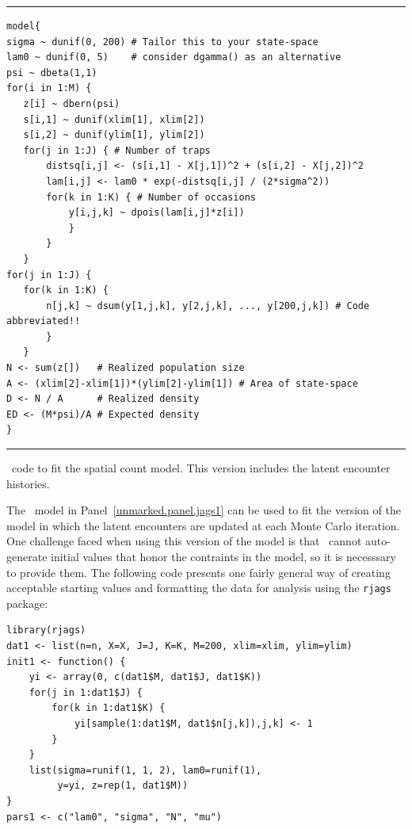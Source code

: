 \begin{panel}
\centering
\rule[0.05in]{\textwidth}{.03in}
\begin{small}
\begin{verbatim}
model{
sigma ~ dunif(0, 200) # Tailor this to your state-space
lam0 ~ dunif(0, 5)    # consider dgamma() as an alternative
psi ~ dbeta(1,1)
for(i in 1:M) {
   z[i] ~ dbern(psi)
   s[i,1] ~ dunif(xlim[1], xlim[2])
   s[i,2] ~ dunif(ylim[1], ylim[2])
   for(j in 1:J) { # Number of traps
       distsq[i,j] <- (s[i,1] - X[j,1])^2 + (s[i,2] - X[j,2])^2
       lam[i,j] <- lam0 * exp(-distsq[i,j] / (2*sigma^2))
       for(k in 1:K) { # Number of occasions
           y[i,j,k] ~ dpois(lam[i,j]*z[i])
           }
       }
   }
for(j in 1:J) {
   for(k in 1:K) {
       n[j,k] ~ dsum(y[1,j,k], y[2,j,k], ..., y[200,j,k]) # Code abbreviated!!
       }
   }
N <- sum(z[])   # Realized population size
A <- (xlim[2]-xlim[1])*(ylim[2]-ylim[1]) # Area of state-space
D <- N / A      # Realized density
ED <- (M*psi)/A # Expected density
}
\end{verbatim}
\end{small}
\rule[0.15in]{\textwidth}{.03in}
\caption{\jags~code to fit the spatial count model. This version
  includes the latent encounter histories.}
\label{unmarked.panel.jags1}
\end{panel}

The \jags~model in Panel~\ref{unmarked.panel.jags1} can be used to
fit the version of the model in which the latent encounters are
updated at each Monte Carlo iteration. One challenge faced when using
this version of the model is that \jags~cannot auto-generate initial values
that honor the contraints in the model, so it is necesssary to provide
them. The following code presents one fairly general way of creating
acceptable starting values and formatting the data for analysis using
the \texttt{rjags} package:
\begin{small}
\begin{verbatim}
library(rjags)
dat1 <- list(n=n, X=X, J=J, K=K, M=200, xlim=xlim, ylim=ylim)
init1 <- function() {
    yi <- array(0, c(dat1$M, dat1$J, dat1$K))
    for(j in 1:dat1$J) {
        for(k in 1:dat1$K) {
            yi[sample(1:dat1$M, dat1$n[j,k]),j,k] <- 1
        }
    }
    list(sigma=runif(1, 1, 2), lam0=runif(1),
         y=yi, z=rep(1, dat1$M))
}
pars1 <- c("lam0", "sigma", "N", "mu")
\end{verbatim}
\end{small}

